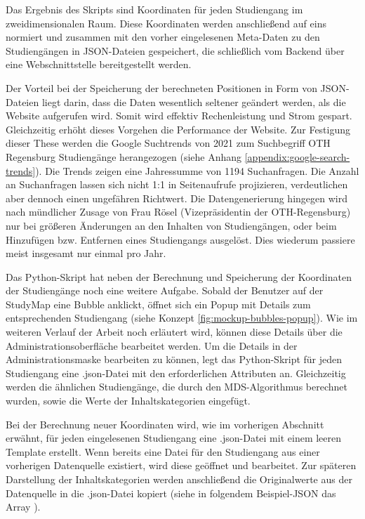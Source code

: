 Das Ergebnis des Skripts sind Koordinaten für jeden Studiengang im zweidimensionalen Raum. Diese Koordinaten werden anschließend auf eins normiert und zusammen mit den vorher eingelesenen Meta-Daten zu den Studiengängen in JSON-Dateien gespeichert, die schließlich vom Backend über eine Webschnittstelle bereitgestellt werden.

Der Vorteil bei der Speicherung der berechneten Positionen in Form von
JSON-Dateien liegt darin, dass die Daten wesentlich seltener geändert werden,
als die Website aufgerufen wird. Somit wird effektiv Rechenleistung und Strom
gespart. Gleichzeitig erhöht
dieses Vorgehen die Performance der Website. Zur Festigung dieser These werden
die Google Suchtrends von 2021 zum Suchbegriff \glqq OTH Regensburg
Studiengänge\grqq{} herangezogen (siehe Anhang
\ref{appendix:google-search-trends}). Die Trends zeigen eine Jahressumme von
1194 Suchanfragen. Die Anzahl an Suchanfragen lassen sich nicht 1:1 in
Seitenaufrufe projizieren, verdeutlichen aber dennoch einen ungefähren
Richtwert. Die Datengenerierung hingegen wird nach mündlicher Zusage von
Frau Rösel (Vizepräsidentin der OTH-Regensburg) nur bei größeren Änderungen an den
Inhalten von Studiengängen, oder beim Hinzufügen bzw. Entfernen eines 
Studiengangs ausgelöst. Dies wiederum passiere meist insgesamt nur einmal pro
Jahr.

Das Python-Skript hat neben der Berechnung und Speicherung der Koordinaten der Studiengänge noch eine weitere Aufgabe. Sobald der Benutzer auf der StudyMap eine Bubble anklickt, öffnet sich ein Popup mit Details zum entsprechenden Studiengang (siehe Konzept \autoref{fig:mockup-bubbles-popup}). Wie im weiteren Verlauf der Arbeit noch erläutert wird, können diese Details über die Administrationsoberfläche bearbeitet werden. Um die Details in der Administrationsmaske bearbeiten zu können, legt das Python-Skript für jeden Studiengang eine .json-Datei mit den erforderlichen Attributen an. Gleichzeitig werden die ähnlichen Studiengänge, die durch den MDS-Algorithmus berechnet wurden, sowie die Werte der Inhaltskategorien eingefügt.

Bei der Berechnung neuer Koordinaten wird, wie im vorherigen Abschnitt erwähnt, für jeden eingelesenen Studiengang eine .json-Datei mit einem leeren Template erstellt. Wenn bereits eine Datei für den Studiengang aus einer vorherigen Datenquelle existiert, wird diese geöffnet und bearbeitet. Zur späteren Darstellung der Inhaltskategorien werden anschließend die Originalwerte aus der Datenquelle in die .json-Datei kopiert (siehe in folgendem Beispiel-JSON das Array ).

